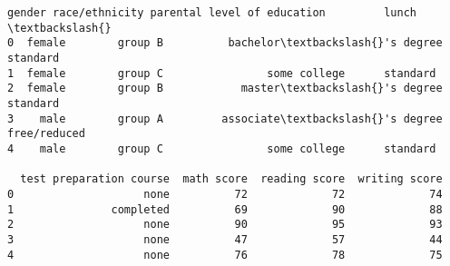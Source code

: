             \begin{tcolorbox}[breakable, size=fbox, boxrule=.5pt, pad at break*=1mm, opacityfill=0]
\begin{Verbatim}[commandchars=\\\{\}]
   gender race/ethnicity parental level of education         lunch  \textbackslash{}
0  female        group B          bachelor\textbackslash{}'s degree      standard
1  female        group C                some college      standard
2  female        group B            master\textbackslash{}'s degree      standard
3    male        group A         associate\textbackslash{}'s degree  free/reduced
4    male        group C                some college      standard

  test preparation course  math score  reading score  writing score
0                    none          72             72             74
1               completed          69             90             88
2                    none          90             95             93
3                    none          47             57             44
4                    none          76             78             75
\end{Verbatim}
\end{tcolorbox}
        

